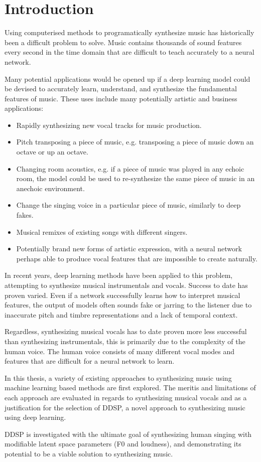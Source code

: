 \chapter{Introduction}

Using computerised methods to programatically synthesize music has historically been a difficult problem to solve. Music contains thousands of sound features every second in the time domain that are difficult to teach accurately to a neural network.

Many potential applications would be opened up if a deep learning model could be devised to accurately learn, understand, and synthesize the fundamental features of music. These uses include many potentially artistic and business applications:

\begin{itemize}
    \item Rapidly synthesizing new vocal tracks for music production.
    \item Pitch transposing a piece of music, e.g. transposing a piece of music down an octave or up an octave.
    \item Changing room acoustics, e.g. if a piece of music was played in any echoic room, the model could be used to re-synthesize the same piece of music in an anechoic environment.
    \item Change the singing voice in a particular piece of music, similarly to deep fakes.
    \item Musical remixes of existing songs with different singers.
    \item Potentially brand new forms of artistic expression, with a neural network perhaps able to produce vocal features that are impossible to create naturally.
\end{itemize}

In recent years, deep learning methods have been applied to this problem, attempting to synthesize musical instrumentals and vocals. Success to date has proven varied. Even if a network successfully learns how to interpret musical features, the output of models often sounds fake or jarring to the listener due to inaccurate pitch and timbre representations and a lack of temporal context.

Regardless, synthesizing musical vocals has to date proven more less successful than synthesizing instrumentals, this is primarily due to the complexity of the human voice. The human voice consists of many different vocal modes and features that are difficult for a neural network to learn.

In this thesis, a variety of existing approaches to synthesizing music using machine learning based methods are first explored. The meritis and limitations of each approach are evaluated in regards to synthesizing musical vocals and as a justification for the selection of DDSP, a novel approach to synthesizing music using deep learning.

DDSP is investigated with the ultimate goal of synthesizing human singing with modifiable latent space parameters (F0 and loudness), and demonstrating its potential to be a viable solution to synthesizing music.




